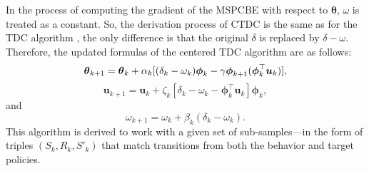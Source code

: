 In the process of computing the gradient of the MSPCBE with respect to ${\bm{\theta}}$, 
$\omega$ is treated as a constant.
So, the derivation process of CTDC is the same 
as for the TDC algorithm \cite{sutton2009fast}, the only difference is that the original $\delta$ is replaced by $\delta-\omega$.
Therefore, the updated formulas of the centered TDC  algorithm are as follows:
\begin{equation}
 \bm{{\bm{\theta}}}_{k+1}=\bm{{\bm{\theta}}}_{k}+\alpha_{k}[(\delta_{k}- \omega_k) \bm{\bm{{\bm{\phi}}}}_k\\
 - \gamma\bm{\bm{{\bm{\phi}}}}_{k+1}(\bm{\bm{{\bm{\phi}}}}^{\top}_k \bm{u}_{k})],
\label{thetavmtdc}
\end{equation}
\begin{equation}
 \bm{u}_{k+1}= \bm{u}_{k}+\zeta_{k}[\delta_{k}-\omega_k - \bm{\bm{{\bm{\phi}}}}^{\top}_k \bm{u}_{k}]\bm{\bm{{\bm{\phi}}}}_k,
\label{uvmtdc}
\end{equation}
and
\begin{equation}
 \omega_{k+1}= \omega_{k}+\beta_k (\delta_k- \omega_k).
 \label{omegavmtdc}
\end{equation}
This algorithm is derived to work 
with a given set of sub-samples—in the form of 
triples $(S_k, R_k, S'_k)$ that match transitions 
from both the behavior and target policies. 


